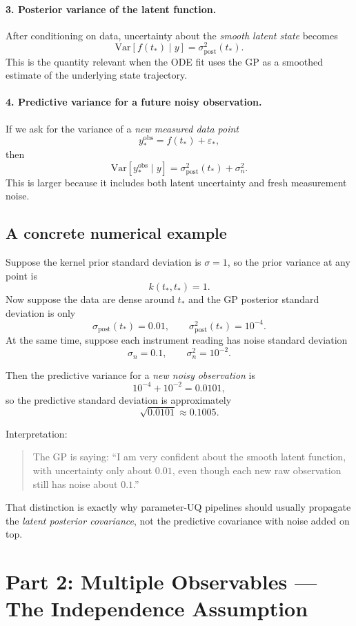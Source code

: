 \documentclass[11pt]{article}
\begin{document}
\paragraph{3. Posterior variance of the latent function.}
After conditioning on data, uncertainty about the \emph{smooth latent state} becomes
\[
\mathrm{Var}[f(t_*) \mid y] = \sigma^2_{\mathrm{post}}(t_*).
\]
This is the quantity relevant when the ODE fit uses the GP as a smoothed estimate of the underlying state trajectory.

\paragraph{4. Predictive variance for a future noisy observation.}
If we ask for the variance of a \emph{new measured data point}
\[
y_*^{\mathrm{obs}} = f(t_*) + \varepsilon_*,
\]
then
\[
\mathrm{Var}[y_*^{\mathrm{obs}} \mid y]
=
\sigma^2_{\mathrm{post}}(t_*) + \sigma_n^2.
\]
This is larger because it includes both latent uncertainty and fresh measurement noise.

\subsection*{A concrete numerical example}
Suppose the kernel prior standard deviation is $\sigma=1$, so the prior variance at any point is
\[
k(t_*,t_*) = 1.
\]
Now suppose the data are dense around $t_*$ and the GP posterior standard deviation is only
\[
\sigma_{\mathrm{post}}(t_*) = 0.01,
\qquad
\sigma^2_{\mathrm{post}}(t_*) = 10^{-4}.
\]
At the same time, suppose each instrument reading has noise standard deviation
\[
\sigma_n = 0.1,
\qquad
\sigma_n^2 = 10^{-2}.
\]

Then the predictive variance for a \emph{new noisy observation} is
\[
10^{-4} + 10^{-2} = 0.0101,
\]
so the predictive standard deviation is approximately
\[
\sqrt{0.0101} \approx 0.1005.
\]

Interpretation:
\begin{quote}
The GP is saying: ``I am very confident about the smooth latent function, with uncertainty only about $0.01$, even though each new raw observation still has noise about $0.1$.''
\end{quote}

That distinction is exactly why parameter-UQ pipelines should usually propagate the \emph{latent posterior covariance}, not the predictive covariance with noise added on top.

\section{Part 2: Multiple Observables --- The Independence Assumption}
\end{document}
